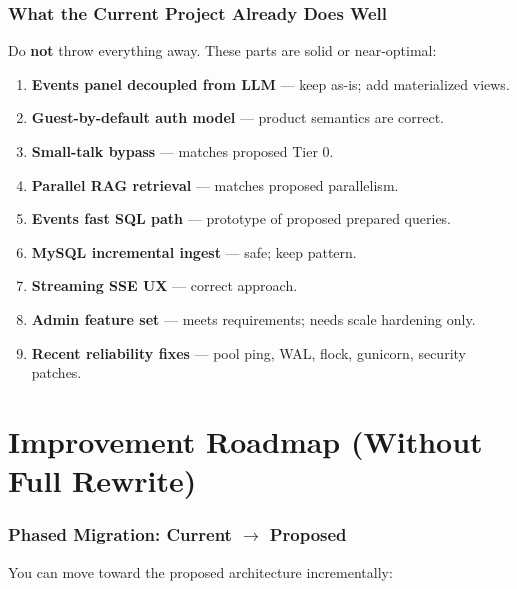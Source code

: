 \documentclass[11pt,a4paper]{article}
\begin{document}
\section{What the Current Project Already Does Well}

Do \textbf{not} throw everything away. These parts are solid or near-optimal:

\begin{enumerate}
  \item \textbf{Events panel decoupled from LLM} --- keep as-is; add materialized views.
  \item \textbf{Guest-by-default auth model} --- product semantics are correct.
  \item \textbf{Small-talk bypass} --- matches proposed Tier 0.
  \item \textbf{Parallel RAG retrieval} --- matches proposed parallelism.
  \item \textbf{Events fast SQL path} --- prototype of proposed prepared queries.
  \item \textbf{MySQL incremental ingest} --- safe; keep pattern.
  \item \textbf{Streaming SSE UX} --- correct approach.
  \item \textbf{Admin feature set} --- meets requirements; needs scale hardening only.
  \item \textbf{Recent reliability fixes} --- pool ping, WAL, flock, gunicorn, security patches.
\end{enumerate}

\part{Improvement Roadmap (Without Full Rewrite)}

\section{Phased Migration: Current $\rightarrow$ Proposed}

You can move toward the proposed architecture incrementally:
\end{document}
